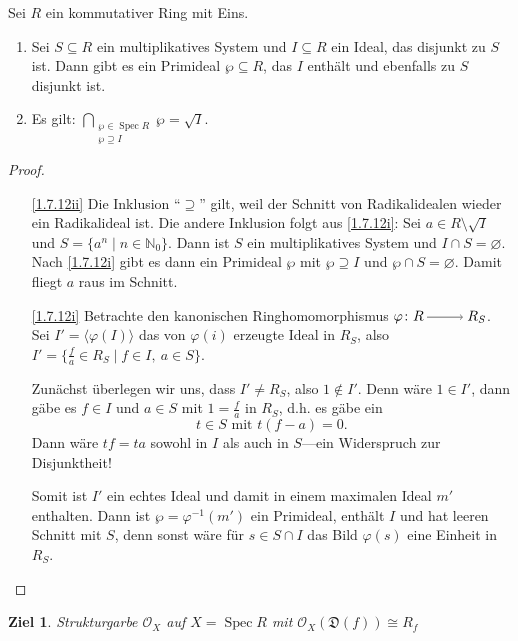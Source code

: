\documentclass[a4paper,12pt]{scrbook}
\newtheorem{ziel}{Ziel}
\newtheorem{proof}{Beweis}
\def\O{\mathcal{O}}
\newcommand{\D}{\mathfrak{D}}
\newcommand{\Spec}{\operatorname{Spec}}
\renewcommand{\phi}{\varphi}
\newcommand{\leer}{\ensuremath{\varnothing}}
\newcommand{\set}[1]{\ensuremath{\mathbb{#1}}}
\newcommand{\N}{\set{N}}
\newcommand{\ra}{\raisebox{-1pt}{\tikz{\draw[thin,shorten >=3pt, ->] (0,0) node{\hspace*{-2pt}} -- node{} (1,0);}}\penalty1000\relax}
\begin{document}
\begin{lem}\label{1.7.12}
  Sei $R$ ein kommutativer Ring mit Eins.
  \begin{enumerate}
  \item{} Sei $S\subseteq R$ ein multiplikatives System und $I\subseteq R$ ein Ideal, das disjunkt zu $S$ ist. Dann
    gibt es ein Primideal $\wp\subseteq R$, das $I$ enthält und ebenfalls zu $S$ disjunkt ist.
  \item{} Es gilt: $\displaystyle\!\!\!\bigcap_{\substack{\wp\in\Spec R\\\wp\supseteq I}}\!\!\!\wp = \sqrt{I}$.
  \end{enumerate}
\end{lem}
\begin{proof}
  \begin{enumerate}
  \item[\ref{1.7.12ii}] Die Inklusion \enquote{$\supseteq$} gilt, weil der Schnitt von Radikalidealen wieder ein Radikalideal
    ist. Die andere Inklusion folgt aus \ref{1.7.12i}: Sei $a\in R\setminus\sqrt{I}$ und $S=\{a^n\mid n\in\N_0\}$. Dann ist $S$
    ein multiplikatives System und $I\cap S=\leer$. Nach \ref{1.7.12i} gibt es dann ein Primideal $\wp$ mit $\wp\supseteq I$ und
    $\wp\cap S=\leer$. Damit fliegt $a$ raus im Schnitt.
  \item[\ref{1.7.12i}] Betrachte den kanonischen Ringhomomorphismus $\phi\colon R\ra R_S$. Sei $I'=\langle\phi(I)\rangle$ das von $\phi(i)$
    erzeugte Ideal in $R_S$, also $I'=\{\frac{f}{a}\in R_S\mid f\in I,\ a\in S\}$.

    Zunächst überlegen wir uns, dass $I'\neq R_S$, also $1\notin I'$. Denn wäre $1\in I'$, dann gäbe es $f\in I$ und $a\in S$
    mit $1=\frac{f}{a}$ in $R_S$, d.h. es gäbe ein
    \[t\in S\text{ mit }t(f-a)=0.\] 
    Dann wäre $tf=ta$ sowohl in $I$ als auch in $S$---ein Widerspruch zur Disjunktheit!

    Somit ist $I'$ ein echtes Ideal und damit in einem maximalen Ideal $m'$ enthalten. Dann ist $\wp=\phi^{-1}(m')$ ein
    Primideal, enthält $I$ und hat leeren Schnitt mit $S$, denn sonst wäre für $s\in S\cap I$ das Bild $\phi(s)$ eine Einheit in
    $R_S$.
  \end{enumerate}
\end{proof}

\begin{ziel}
  Strukturgarbe $\O_X$ auf $X=\Spec R$ mit $\O_X(\D(f))\cong R_f$
\end{ziel}
\end{document}
